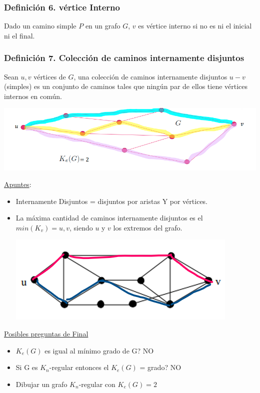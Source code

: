 \documentclass{article}
\begin{document}
\subsubsection*{Definición 6. vértice Interno}
Dado un camino simple $P$ en un grafo $G$, $v$ es vértice interno si no es ni el inicial ni el final.

\subsubsection*{Definición 7. Colección de caminos internamente disjuntos}
Sean $u, v$ vértices de $G$, una colección de caminos internamente disjuntos $u - v$ (simples) es un conjunto de caminos tales que ningún par de ellos tiene vértices internos en común.
\begin{center}
    \includegraphics[width=.70\textwidth]{colCaminosInternamenteDisj.PNG}
\end{center}
\underline{Apuntes}:
\begin{itemize}
    \item Internamente Disjuntos = disjuntos por aristas Y por vértices.
    \item La máxima cantidad de caminos internamente disjuntos es el
     \\$min(K_v) = { u, v }$, siendo $u$ y $v$ los extremos del grafo.
    \begin{center}
        \includegraphics[width=.40\textwidth]{maxCantCaminosInternamenteDisjuntos.PNG}
    \end{center}
\end{itemize}
\underline{Posibles preguntas de Final}
\begin{itemize}
    \item $K_e(G)$ es igual al mínimo grado de G? NO
    \item Si G es $K_n$-regular entonces el $K_e(G)$ = grado? NO
    \item Dibujar un grafo $K_n$-regular con $K_e(G) = 2$
\end{itemize}
\end{document}
